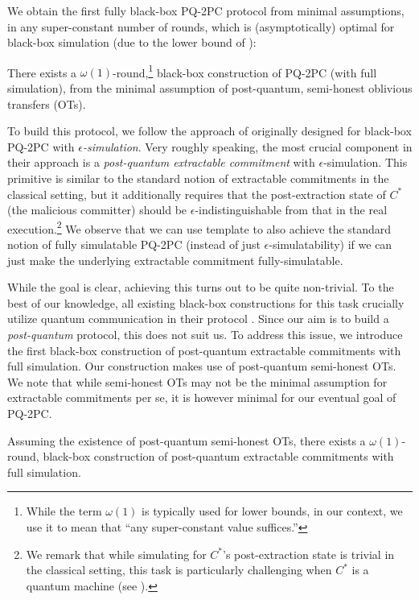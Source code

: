 We obtain the first fully black-box PQ-2PC protocol from minimal assumptions, in any super-constant number of rounds, which is (asymptotically) optimal for black-box simulation (due to the lower bound of \cite{chia2022impossibility}):
\begin{theorem}\label{thm:informal:full2PC}
There exists a $\omega(1)$-round,\footnote{While the term $\omega(1)$ is typically used for lower bounds, in our context, we use it to mean that ``any super-constant value suffices.''} black-box construction of PQ-2PC (with full simulation), from the minimal assumption of post-quantum, semi-honest oblivious transfers (OTs). 
\end{theorem}
To build this protocol, we follow the approach of \cite{C:CCLY22} originally designed for black-box PQ-2PC with {\em $\epsilon$-simulation}. Very roughly speaking, the most crucial component in their approach is a {\em post-quantum extractable commitment} with $\epsilon$-simulation. This primitive is similar to the standard notion of extractable commitments in the classical setting, but it additionally requires that the post-extraction state of $C^*$ (the malicious committer) should be $\epsilon$-indistinguishable from that in the real execution.\footnote{We remark that while simulating for $C^*$'s post-extraction state is trivial in the classical setting, this task is particularly challenging when $C^*$ is a quantum machine (see \cite{C:CCLY22}).} We observe that we can use \cite{C:CCLY22} template to also achieve the standard notion of fully simulatable PQ-2PC (instead of just $\epsilon$-simulatability) if we can just make the underlying extractable commitment fully-simulatable. 

While the goal is clear, achieving this turns out to be quite non-trivial. To the best of our knowledge, all existing black-box constructions for this task crucially utilize quantum communication in their protocol \cite{C:BCKM21b,EC:GLSV21}. Since our aim is to build a {\em post-quantum} protocol, this does not suit us. To address this issue, we introduce the first black-box construction of post-quantum extractable commitments with full simulation. Our construction makes use of post-quantum semi-honest OTs. We note that while semi-honest OTs may not be the minimal assumption for extractable commitments per se, it is however minimal for our eventual goal of PQ-2PC.
\begin{lemma}\label{lemma:informal:fullExtCom}
    Assuming the existence of post-quantum semi-honest OTs, there exists a $\omega(1)$-round, black-box construction of post-quantum extractable commitments with full simulation. 
\end{lemma}

